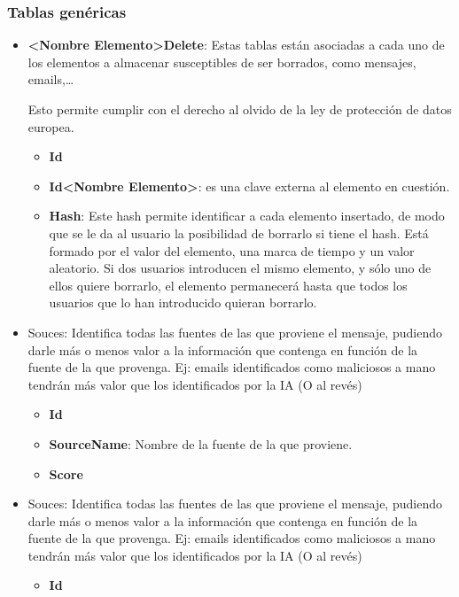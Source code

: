 \subsubsection{Tablas genéricas}
\begin{itemize}
    \item \textbf{<Nombre Elemento>Delete}: Estas tablas están asociadas a cada uno de los elementos a almacenar susceptibles de ser borrados, como mensajes, emails,…
    
    Esto permite cumplir con el derecho al olvido de la ley de protección de datos europea.
    \begin{itemize}
        \item \textbf{Id}
        \item \textbf{Id<Nombre Elemento>}: es una clave externa al elemento en cuestión.
        \item \textbf{Hash}: Este hash permite identificar a cada elemento insertado, de modo que se le da al usuario la posibilidad de borrarlo si tiene el hash. 
        Está formado por el valor del elemento, una marca de tiempo y un valor aleatorio.
        Si dos usuarios introducen el mismo elemento, y sólo uno de ellos quiere borrarlo, el elemento permanecerá hasta que todos los usuarios que lo han introducido quieran borrarlo.
    \end{itemize}
        \item <Nombre Elemento>Souces: Identifica todas las fuentes de las que proviene el mensaje, pudiendo darle más o menos valor a la información que contenga en función de la fuente de la que provenga. Ej: emails identificados como maliciosos a mano tendrán más valor que los identificados por la IA (O al revés)
        \begin{itemize}
            \item \textbf{Id}
            \item \textbf{SourceName}: Nombre de la fuente de la que proviene.
            \item \textbf{Score}
        \end{itemize}
    \item <Nombre Elemento>Souces: Identifica todas las fuentes de las que proviene el mensaje, pudiendo darle más o menos valor a la información que contenga en función de la fuente de la que provenga. Ej: emails identificados como maliciosos a mano tendrán más valor que los identificados por la IA (O al revés)
    \begin{itemize}
        \item \textbf{Id}

\end{itemize}
\end{itemize}
